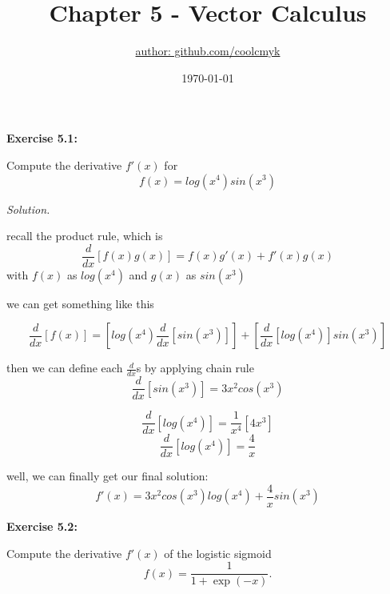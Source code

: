 \documentclass[12pt, a4paper]{article}
\title{Chapter 5 - Vector Calculus}
\author{\href{https://github.com/coolcmyk}{author: github.com/coolcmyk}}
\date{\today}
\newenvironment{problem}[1][Problem]{\noindent\textbf{#1:}\par\vspace{0.5em}}{\vspace{1em}}
\newenvironment{solution}{\noindent\textit{Solution.}\par\vspace{0.5em}}{\vspace{2em}}
\begin{document}
\maketitle

\begin{problem}[Exercise 5.1]
  Compute the derivative $f'(x)$ for \\
  \[
  f(x) = log(x^4)sin(x^3)
  \]
\end{problem}

\begin{solution}
recall the product rule, which is
  \[
    \frac{d}{dx}[f(x)g(x)] = f(x)g'(x) + f'(x)g(x)
  \]
  with $f(x)$ as $log(x^4)$ and $g(x)$ as $sin(x^3)$

  \vspace{0.5em}

  we can get something like this

  \[
    \frac{d}{dx}[f(x)] = [log(x^4)\frac{d}{dx}[sin(x^3)]] + [\frac{d}{dx}[log(x^4)]sin(x^3)]
  \]

  \vspace{0.5em}

  then we can define each $\frac{d}{dx}$s by applying chain rule
  \[\frac{d}{dx}[sin(x^3)] = 3x^2cos(x^3)\]

  \[\frac{d}{dx}[log(x^4)] = \frac{1}{x^4}[4x^3]\]
  \[\frac{d}{dx}[log(x^4)] = \frac{4}{x}\]

  well, we can finally get our final solution:
  \[
    f'(x) = 3x^2cos(x^3)log(x^4) + \frac{4}{x}sin(x^3)
  \]
\end{solution}



\newpage


\begin{problem}[Exercise 5.2]
  Compute the derivative $f'(x)$ of the logistic sigmoid
  \[
    f(x) = \frac{1}{1 + \exp(-x)}.
  \]
\end{problem}
\end{document}
